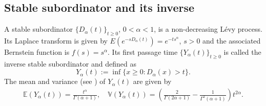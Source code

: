 \documentclass[11pt,oneside,reqno]{amsart}
\theoremstyle{definition}
\theoremstyle{remarkstyle}
\begin{document}
\subsection{Stable subordinator and its inverse}\label{stable subordinator} A stable subordinator $\{D_{\alpha}(t)\}_{t\geq 0}$, $0<\alpha<1$, is a non-decreasing L\'{e}vy process. Its Laplace transform is given by $E(e^{-sD_\alpha(t)})=e^{-ts^\alpha}$, $s>0$ and the associated Bernstein function is $f(s)=s^\alpha$. Its first passage time $\{Y_\alpha(t)\}_{t\geq 0}$ is called the inverse stable subordinator and defined as  
\begin{equation*}
Y_\alpha(t):=\inf\{x\geq 0:D_{\alpha}(x)>t \}.
\end{equation*}
The mean and variance (see \citet{Leonenko2014}) of $Y_\alpha(t)$ are given by
\begin{align*}
\mathbb{E}(Y_{\alpha}(t))=\frac{t^\alpha}{\Gamma(\alpha+1)}, \quad
\mathbb{V}(Y_\alpha(t))=\left(\frac{2}{\Gamma(2\alpha+1)}-\frac{1}{\Gamma^2(\alpha+1)}\right)t^{2\alpha}.
\end{align*}
\end{document}
